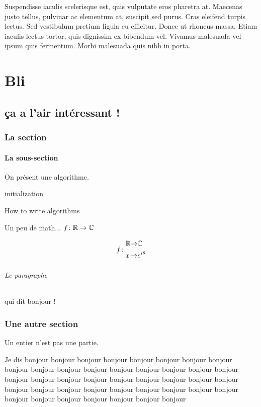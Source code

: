 \documentclass[12pt,french,a4paper]{report}
\begin{document}
Suspendisse iaculis scelerisque est, quis vulputate eros pharetra at. Maecenas justo tellus, pulvinar ac elementum at, suscipit sed purus. Cras eleifend turpis lectus. Sed vestibulum pretium ligula eu efficitur. Donec ut rhoncus massa. Etiam iaculis lectus tortor, quis dignissim ex bibendum vel. Vivamus malesuada vel ipsum quis fermentum. Morbi malesuada quis nibh in porta.



\part{Bli}
\chapter{ça a l'air intéressant !}

\section{La section}
\subsection{La sous-section}

On présent une algorithme.

\begin{algorithm}[H]
initialization\;
\caption{How to write algorithms}
\end{algorithm}

Un peu de math... $f \colon \mathbb{R} \to \mathbb{C}$

\[
f \colon \begin{alignedat}{2} &\mathbb{R} &\to &\mathbb{C}\\ &x &\mapsto &e^{i\theta} \end{alignedat}
\]

\paragraph{Le paragraphe} qui dit bonjour !


\section{Une autre section}

\begin{defi}[Un entier]
Un entier n'est pas une partie.
\end{defi}

\begin{ex}
Je dis bonjour bonjour bonjour bonjour bonjour bonjour bonjour bonjour bonjour bonjour bonjour bonjour bonjour bonjour bonjour bonjour bonjour bonjour bonjour bonjour bonjour bonjour bonjour bonjour bonjour bonjour bonjour bonjour bonjour bonjour bonjour bonjour bonjour bonjour bonjour bonjour bonjour bonjour bonjour bonjour bonjour bonjour
\end{ex}

\end{document}
